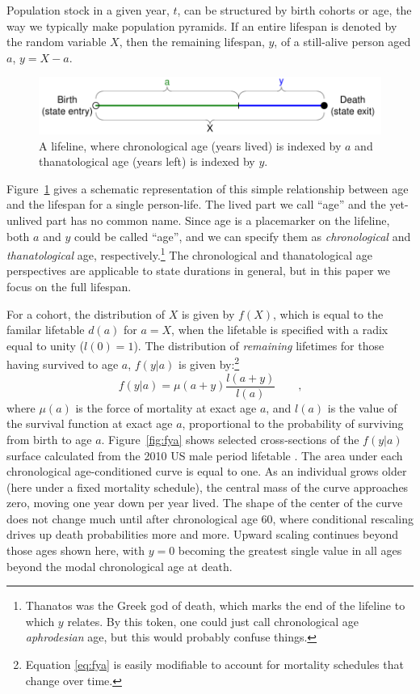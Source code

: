\documentclass{article}
\newcommand{\tc}{\quad\quad\text{,}}
\begin{document}
Population stock in a
 given year, $t$, can be structured by birth cohorts or age, the way we typically make 
 population pyramids. If an entire lifespan is denoted by the random variable
 $X$, then the remaining lifespan, $y$, of a still-alive person aged $a$, $y = X - a$.
\begin{figure}[h]
\centering
	\caption{A lifeline, where chronological age (years lived) is indexed by $a$
	and thanatological age (years left) is indexed by $y$.}
	\label{fig:line}
	\includegraphics[scale=.8]{Figures/LifeLine.pdf}	
\end{figure}
Figure~\ref{fig:line} gives a schematic representation of this simple
relationship between age and the lifespan for a single person-life. The lived
part we call ``age'' and the yet-unlived part has no common name. Since age is a
placemarker on the lifeline, both $a$ and $y$ could be called ``age'', and we
can specify them as \textit{chronological} and \textit{thanatological} age,
respectively.\footnote{Thanatos was the Greek god of death, which marks the end of the lifeline to which $y$ relates. By this token, one could just call chronological age \textit{aphrodesian} age, but this would probably confuse things.}
The chronological and thanatological age perspectives are applicable to state
durations in general, but in this paper we focus on the full lifespan.

For a cohort, the distribution of $X$ is given by $f(X)$, which is equal to the familar lifetable
$d(a)$ for $a = X$, when the lifetable is specified with a radix equal
to unity ($l(0)=1$).
The distribution of \textit{remaining} lifetimes for those having survived to age $a$, $f(y|a)$ is
given by:\footnote{Equation \eqref{eq:fya} is easily modifiable to account for
mortality schedules that change over time.}
\begin{equation}
\label{eq:fya}
f(y|a) = \mu(a+y) \frac{l(a+y)}{l(a)} \tc
\end{equation}
where $\mu(a)$ is the force of mortality at exact age $a$, and $l(a)$ is
the value of the survival function at exact age $a$, proportional to the
probability of surviving from birth to age $a$. Figure~\ref{fig:fya} shows selected
cross-sections of the $f(y|a)$ surface calculated from the 2010 US male period
lifetable . The area under each chronological age-conditioned curve is equal to one.
As an individual grows older (here under a fixed mortality schedule), the
central mass of the curve approaches zero, moving one year down per year lived. The shape of the center of
the curve does not change much until after chronological age 60, where
conditional rescaling drives up death probabilities more and more. Upward
scaling continues beyond those ages shown here, with $y=0$ becoming the greatest
single value in all ages beyond the modal chronological age at death.
\end{document}
